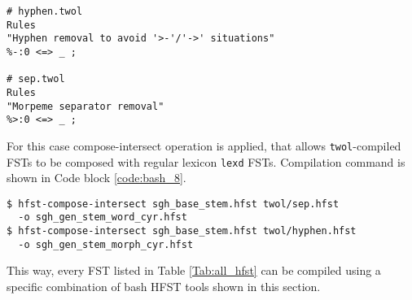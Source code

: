 \begin{code_frame}[float,floatplacement=!h]
    \begin{footnotesize}\codespacing
    \begin{verbatim}
# hyphen.twol
Rules
"Hyphen removal to avoid '>-'/'->' situations"
%-:0 <=> _ ;

# sep.twol
Rules
"Morpeme separator removal"
%>:0 <=> _ ;
    \end{verbatim}
    \end{footnotesize}
    \tcblower
    \label{code:twol_4_1}
\end{code_frame}

For this case compose-intersect operation is applied, that allows \texttt{twol}-compiled FSTs to be composed with regular lexicon \texttt{lexd} FSTs. Compilation command is shown in Code block \ref{code:bash_8}.

\begin{code_frame}[float,floatplacement=!h]
    \begin{footnotesize}\codespacing
    \begin{verbatim}
$ hfst-compose-intersect sgh_base_stem.hfst twol/sep.hfst 
  -o sgh_gen_stem_word_cyr.hfst
$ hfst-compose-intersect sgh_base_stem.hfst twol/hyphen.hfst 
  -o sgh_gen_stem_morph_cyr.hfst
    \end{verbatim}
    \end{footnotesize}
    \tcblower
    \label{code:bash_8}
\end{code_frame}

This way, every FST listed in Table \ref{Tab:all_hfst} can be compiled using a specific combination of bash HFST tools shown in this section.

